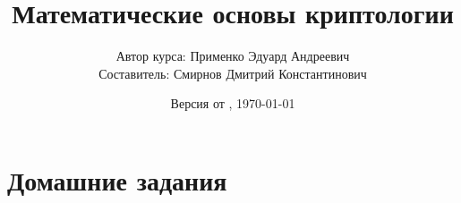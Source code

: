 \documentclass[a4paper,11pt,openany]{book}
\title{Математические основы криптологии}
\author{Автор курса: Применко Эдуард Андреевич \\ 
		Составитель: Смирнов Дмитрий Константинович}
\date{Версия от \currenttime, \today}
\begin{document}
\maketitle
\tableofcontents

\mainmatter
\chapter{Домашние задания}






%
\end{document}
